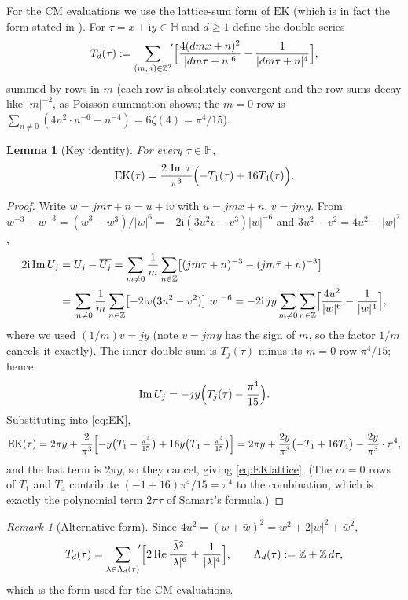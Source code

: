 \documentclass[11pt]{article}
\newtheorem{lemma}[theorem]{Lemma}
\theoremstyle{definition}
\theoremstyle{remark}
\newtheorem{remark}[theorem]{Remark}
\newcommand{\Hh}{\mathbb{H}}
\newcommand{\Zz}{\mathbb{Z}}
\newcommand{\cL}{\Lambda}
\newcommand{\ii}{\mathrm{i}}
\newcommand{\ImT}{\operatorname{Im}}
\newcommand{\ReT}{\operatorname{Re}}
\begin{document}
For the CM evaluations we use the lattice-sum form of $\mathrm{EK}$
(which is in fact the form stated in \cite[Prop.~2.1]{Sa13}). For
$\tau=x+\ii y\in\Hh$ and $d\ge1$ define the double series
\begin{equation}\label{eq:Td}
  T_d(\tau):={\sum_{(m,n)\in\Zz^2}}^{\!\prime}
  \Bigl[\frac{4(dmx+n)^2}{|dm\tau+n|^6}-\frac{1}{|dm\tau+n|^4}\Bigr],
\end{equation}
summed by rows in $m$ (each row is absolutely convergent and the row sums
decay like $|m|^{-2}$, as Poisson summation shows; the $m=0$ row is
$\sum_{n\neq0}(4n^2\cdot n^{-6}-n^{-4})=6\zeta(4)=\pi^4/15$).

\begin{lemma}[Key identity]\label{lem:latticeEK}
For every $\tau\in\Hh$,
\begin{equation}\label{eq:EKlattice}
  \mathrm{EK}(\tau)=\frac{2\,\ImT\tau}{\pi^3}\Bigl(-T_1(\tau)+16T_4(\tau)\Bigr).
\end{equation}
\end{lemma}
\begin{proof}
Write $w=jm\tau+n=u+\ii v$ with $u=jmx+n$, $v=jmy$. From
$w^{-3}-\bar w^{-3}=(\bar w^3-w^3)/|w|^6=-2\ii(3u^2v-v^3)|w|^{-6}$ and
$3u^2-v^2=4u^2-|w|^2$,
\begin{align*}
  2\ii\ImT U_j
  &=U_j-\overline{U_j}
   =\sum_{m\neq0}\frac1m\sum_{n\in\Zz}
     \bigl[(jm\tau+n)^{-3}-(jm\bar\tau+n)^{-3}\bigr]  \\
  &=\sum_{m\neq0}\frac1m\sum_{n\in\Zz}
     \bigl[-2\ii v(3u^2-v^2)\bigr]|w|^{-6}
   =-2\ii\, jy\sum_{m\neq0}\sum_{n\in\Zz}
     \Bigl[\frac{4u^2}{|w|^6}-\frac{1}{|w|^4}\Bigr],
\end{align*}
where we used $(1/m)v=jy$ (note $v=jmy$ has the sign of $m$, so the factor
$1/m$ cancels it exactly). The inner double sum is $T_j(\tau)$ minus its
$m=0$ row $\pi^4/15$; hence
\[
  \ImT U_j=-jy\Bigl(T_j(\tau)-\frac{\pi^4}{15}\Bigr).
\]
Substituting into \eqref{eq:EK},
\[
  \mathrm{EK}(\tau)
  =2\pi y+\frac{2}{\pi^3}\Bigl[-y\bigl(T_1-\tfrac{\pi^4}{15}\bigr)
   +16y\bigl(T_4-\tfrac{\pi^4}{15}\bigr)\Bigr]
  =2\pi y+\frac{2y}{\pi^3}\bigl(-T_1+16T_4\bigr)-\frac{2y}{\pi^3}\cdot\pi^4,
\]
and the last term is $2\pi y$, so they cancel, giving \eqref{eq:EKlattice}.
(The $m=0$ rows of $T_1$ and $T_4$ contribute $(-1+16)\pi^4/15=\pi^4$ to the
combination, which is exactly the polynomial term $2\pi\tau$ of Samart's
formula.)
\end{proof}

\begin{remark}[Alternative form]\label{rem:Talt}
Since $4u^2=(w+\bar w)^2=w^2+2|w|^2+\bar w^2$,
\begin{equation}\label{eq:Talt}
  T_d(\tau)={\sum_{\lambda\in\cL_d(\tau)}}^{\!\prime}
  \Bigl[2\ReT\frac{\bar\lambda^2}{|\lambda|^6}+\frac{1}{|\lambda|^4}\Bigr],
  \qquad
  \cL_d(\tau):=\Zz+\Zz\, d\tau,
\end{equation}
which is the form used for the CM evaluations.
\end{remark}
\end{document}
